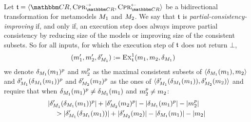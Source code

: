 \begin{definition}
    \label{def:partialconsistencyimprovingtransformation}
    Let $\transformation{t} = \tupled{\consistencyrelationset{CR}, \consistencypreservationrule{\consistencyrelationset{CR}}^{\rightarrow}, \consistencypreservationrule{\consistencyrelationset{CR}}^{\leftarrow}}$ be a bidirectional transformation for metamodels $M_{1}$ and $M_{2}$.
    We say that $\mathfrak{t}$ is \emph{partial-consistency-improving} if, and only if, an execution step does always improve partial consistency by reducing size of the models or improving size of the consistent subsets.
    So for all inputs, for which the execution step of $\mathfrak{t}$ does not return $\bot$,
    \begin{align*}
        & (m_{1}', m_{2}', \delta_{M_{1}}') := \textsc{Ex}_{\mathfrak{t}}^1(m_{1}, m_{2}, \delta_{M_{1}})
    \end{align*}
    we denote $\delta_{M_{1}}(m_{1})^p$ and $m_{2}^p$ as the maximal consistent subsets of $\langle \delta_{M_{1}}(m_{1}), m_{2} \rangle$ and $\delta_{M_{1}}'(\delta_{M_{1}}(m_{1}))^p$ and $\delta_{M_{2}}'(m_{2})^p$ as the ones of $\langle \delta_{M_{1}}'(\delta_{M_{1}}(m_{1})), \delta_{M_{2}}'(m_{2}) \rangle$
    and require that when $\delta_{M_{1}}(m_{1})^p \neq \delta_{M_{1}}(m_{1})$ and $m_{2}^p \neq m_{2}$:
    \begin{align*}
        &
        \lvert\delta_{M_{1}}'(\delta_{M_{1}}(m_{1}))^p\rvert + \lvert\delta_{M_{2}}'(m_{2})^p\rvert 
        - \lvert\delta_{M_{1}}(m_{1})^p\rvert - \lvert m_{2}^p\rvert \\
        & \hspace{1em}
        > \lvert\delta_{M_{1}}'(\delta_{M_{1}}(m_{1}))\rvert + \lvert\delta_{M_{2}}'(m_{2})\rvert 
        - \lvert\delta_{M_{1}}(m_{1})\rvert - \lvert m_{2}\rvert
    \end{align*}
\end{definition}


